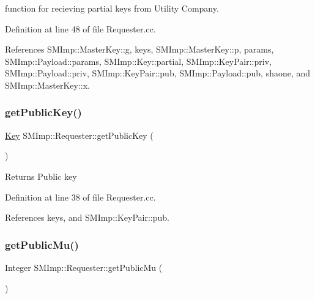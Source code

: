 function for recieving partial keys from Utility Company. 

Definition at line 48 of file Requester.\+cc.



References S\+M\+Imp\+::\+Master\+Key\+::g, keys, S\+M\+Imp\+::\+Master\+Key\+::p, params, S\+M\+Imp\+::\+Payload\+::params, S\+M\+Imp\+::\+Key\+::partial, S\+M\+Imp\+::\+Key\+Pair\+::priv, S\+M\+Imp\+::\+Payload\+::priv, S\+M\+Imp\+::\+Key\+Pair\+::pub, S\+M\+Imp\+::\+Payload\+::pub, shaone, and S\+M\+Imp\+::\+Master\+Key\+::x.

\mbox{\label{classSMImp_1_1Requester_a02db2b7bd3da670640cc382da7100653}} 
\subsubsection{\texorpdfstring{get\+Public\+Key()}{getPublicKey()}}
{\footnotesize\ttfamily \hyperlink{structSMImp_1_1Key}{Key} S\+M\+Imp\+::\+Requester\+::get\+Public\+Key (\begin{DoxyParamCaption}{ }\end{DoxyParamCaption})}

\begin{DoxyReturn}{Returns}
Public key 
\end{DoxyReturn}


Definition at line 38 of file Requester.\+cc.



References keys, and S\+M\+Imp\+::\+Key\+Pair\+::pub.

\mbox{\label{classSMImp_1_1Requester_ae2056dddfa3eebd8a84ed407038ec064}} 
\subsubsection{\texorpdfstring{get\+Public\+Mu()}{getPublicMu()}}
{\footnotesize\ttfamily Integer S\+M\+Imp\+::\+Requester\+::get\+Public\+Mu (\begin{DoxyParamCaption}{ }\end{DoxyParamCaption})}

